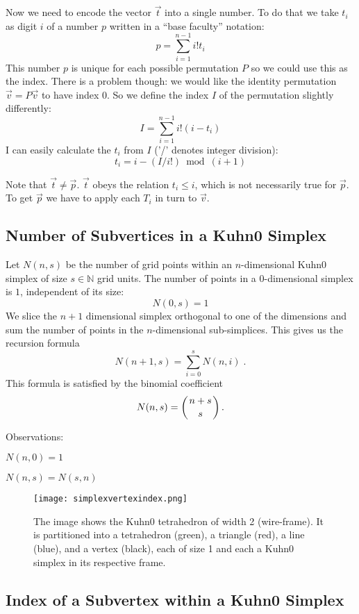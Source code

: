 \documentclass[english,a4paper]{article}
\begin{document}
Now we need to encode the vector $\vec{t}$ into a single number.  To
do that we take $t_i$ as digit $i$ of a number $p$ written in a ``base
faculty'' notation:
\[p=\sum_{i=1}^{n-1}i!t_i\]
This number $p$ is unique for each possible permutation $P$ so we
could use this as the index.  There is a problem though: we would like
the identity permutation $\vec{v}=P\vec{v}$ to have index 0.  So we
define the index $I$ of the permutation slightly differently:
\[I=\sum_{i=1}^{n-1}i!(i-t_i)\]
I can easily calculate the $t_i$ from $I$ ('/' denotes integer
division):
\[t_i=i-(I/i!)\bmod{(i+1)}\]

Note that $\vec{t}\not=\vec{p}$.  $\vec{t}$ obeys the relation
$t_i\leq i$, which is not necessarily true for $\vec{p}$.  To get
$\vec{p}$ we have to apply each $T_i$ in turn to $\vec{v}$.

\subsection{Number of Subvertices in a Kuhn0 Simplex}

Let $N(n,s)$ be the number of grid points within an $n$-dimensional
Kuhn0 simplex of size $s\in\mathbb{N}$ grid units.
The number of points in a $0$-dimensional simplex is $1$, independent of
its size:
\[N(0,s)=1\]
We slice the $n+1$ dimensional simplex orthogonal to one of the
dimensions and sum the number of points in the $n$-dimensional
sub-simplices.  This gives us the recursion formula
\[N(n+1,s)=\sum^s_{i=0}N(n,i)\;.\]
This formula is satisfied by the binomial coefficient\cite{bronstein}
\[N(n,s)=\left({n+s}\atop s\right).\]

Observations:
\begin{compactitem}
\item $N(n,0)=1$
\item $N(n,s)=N(s,n)$
\end{compactitem}

\begin{figure}
  \centering
  \texttt{[image: simplexvertexindex.png]}
  \caption{\label{simplexindex}The image shows the Kuhn0 tetrahedron
    of width 2 (wire-frame).  It is partitioned into a tetrahedron
    (green), a triangle (red), a line (blue), and a vertex (black),
    each of size 1 and each a Kuhn0 simplex in its respective frame.}
\end{figure}

\subsection{Index of a Subvertex within a Kuhn0 Simplex}
\end{document}
